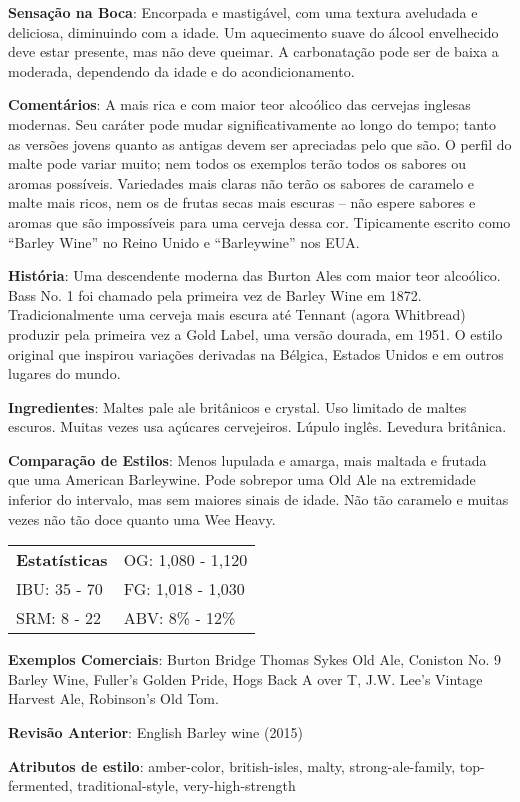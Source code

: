 \textbf{Sensação na Boca}: Encorpada e mastigável, com uma textura aveludada e deliciosa, diminuindo com a idade. Um aquecimento suave do álcool envelhecido deve estar presente, mas não deve queimar. A carbonatação pode ser de baixa a moderada, dependendo da idade e do acondicionamento.

\textbf{Comentários}: A mais rica e com maior teor alcoólico das cervejas inglesas modernas. Seu caráter pode mudar significativamente ao longo do tempo; tanto as versões jovens quanto as antigas devem ser apreciadas pelo que são. O perfil do malte pode variar muito; nem todos os exemplos terão todos os sabores ou aromas possíveis. Variedades mais claras não terão os sabores de caramelo e malte mais ricos, nem os de frutas secas mais escuras – não espere sabores e aromas que são impossíveis para uma cerveja dessa cor. Tipicamente escrito como “Barley Wine” no Reino Unido e “Barleywine” nos EUA.

\textbf{História}: Uma descendente moderna das Burton Ales com maior teor alcoólico. Bass No. 1 foi chamado pela primeira vez de Barley Wine em 1872. Tradicionalmente uma cerveja mais escura até Tennant (agora Whitbread) produzir pela primeira vez a Gold Label, uma versão dourada, em 1951. O estilo original que inspirou variações derivadas na Bélgica, Estados Unidos e em outros lugares do mundo.

\textbf{Ingredientes}: Maltes pale ale britânicos e crystal. Uso limitado de maltes escuros. Muitas vezes usa açúcares cervejeiros. Lúpulo inglês. Levedura britânica.

\textbf{Comparação de Estilos}: Menos lupulada e amarga, mais maltada e frutada que uma American Barleywine. Pode sobrepor uma Old Ale na extremidade inferior do intervalo, mas sem maiores sinais de idade. Não tão caramelo e muitas vezes não tão doce quanto uma Wee Heavy.

\begin{tabular}{@{}p{35mm}p{35mm}@{}}
  \textbf{Estatísticas} & OG: 1,080 - 1,120 \\
  IBU: 35 - 70  & FG: 1,018 - 1,030  \\
  SRM: 8 - 22  & ABV: 8\% - 12\%
\end{tabular}

\textbf{Exemplos Comerciais}: Burton Bridge Thomas Sykes Old Ale, Coniston No. 9 Barley Wine, Fuller’s Golden Pride, Hogs Back A over T, J.W. Lee’s Vintage Harvest Ale, Robinson’s Old Tom.

\textbf{Revisão Anterior}: English Barley wine (2015)


\textbf{Atributos de estilo}: amber-color, british-isles, malty, strong-ale-family, top-fermented, traditional-style, very-high-strength

